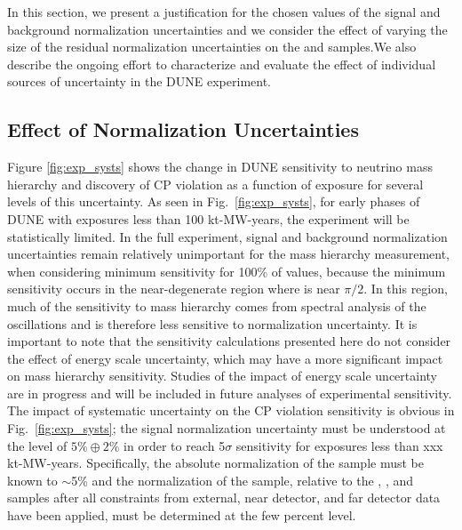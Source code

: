 In this section, we present a justification for the chosen values of the signal and background
normalization uncertainties and we consider the effect of varying the size of the residual normalization
uncertainties on the \nue and \anue samples.We also describe the ongoing effort to characterize and evaluate the effect of individual sources
of uncertainty in the DUNE experiment.

\subsection{Effect of Normalization Uncertainties}
Figure \ref{fig:exp_systs} shows the
change in DUNE sensitivity to neutrino mass hierarchy and discovery of CP violation
as a function of exposure for several levels of this uncertainty.
As seen in Fig.~\ref{fig:exp_systs}, for early phases of DUNE
with exposures less than 100 kt-MW-years, the experiment
will be statistically limited. In the full experiment, signal and
background normalization uncertainties remain
relatively unimportant for the mass hierarchy measurement, when considering
minimum sensitivity for 100\% of \deltacp values, because the minimum sensitivity 
occurs in the near-degenerate region where \deltacp is near $\pi/2$. In this
region, much of the sensitivity to mass hierarchy comes from spectral analysis of
the oscillations and is therefore less sensitive to normalization uncertainty.
It is important to note that the sensitivity calculations presented here do not
consider the effect of energy scale uncertainty, which may have a more significant
impact on mass hierarchy sensitivity. Studies of the impact of energy scale 
uncertainty are in progress and will be included in future analyses of experimental
sensitivity. The impact of systematic uncertainty on the CP violation sensitivity
is obvious in Fig.~\ref{fig:exp_systs}; the \nue signal normalization uncertainty must
be understood at the level of $5\% \oplus 2\%$ in order to reach 5$\sigma$ sensitivity for exposures less 
than xxx kt-MW-years. Specifically,
the absolute normalization of the \numu sample must be known to $\sim$5\% and
the normalization of the \nue sample,
relative to the \anue, \numu, and \anumu samples after all constraints from
external, near detector, and far detector data have been applied, must be determined 
at the few percent level.
